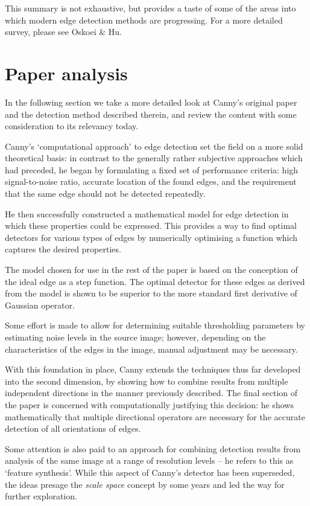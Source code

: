 \documentclass{acm_proc_article-sp}
\begin{document}
This summary is not exhaustive, but provides a taste of some of the areas into
which modern edge detection methods are progressing. For a more detailed
survey, please see Oskoei \& Hu\cite{oskoei2010survey}.

\section{Paper analysis}

In the following section we take a more detailed look at Canny's original
paper\cite{4767851} and the detection method described therein, and review the
content with some consideration to its relevancy today.

Canny's `computational approach' to edge detection set the field on a more
solid theoretical basis: in contrast to the generally rather subjective
approaches which had preceded, he began by formulating a fixed set of
performance criteria: high signal-to-noise ratio, accurate location of the
found edges, and the requirement that the same edge should not be detected
repeatedly.

He then successfully constructed a mathematical model for edge detection in
which these properties could be expressed. This provides a way to find optimal
detectors for various types of edges by numerically optimising a function which
captures the desired properties.

The model chosen for use in the rest of the paper is based on the conception of
the ideal edge as a step function. The optimal detector for these edges as
derived from the model is shown to be superior to the more standard first
derivative of Gaussian operator.

Some effort is made to allow for determining suitable thresholding parameters
by estimating noise levels in the source image; however, depending on the
characteristics of the edges in the image, manual adjustment may be necessary.

With this foundation in place, Canny extends the techniques thus far developed
into the second dimension, by showing how to combine results from multiple
independent directions in the manner previously described.  The final section
of the paper is concerned with computationally justifying this decision: he
shows mathematically that multiple directional operators are necessary for the
accurate detection of all orientations of edges.

Some attention is also paid to an approach for combining detection results from
analysis of the same image at a range of resolution levels -- he refers to this
as `feature synthesis'. While this aspect of Canny's detector has been
superseded, the ideas presage the \emph{scale space} concept by some years and
led the way for further exploration.
\end{document}
